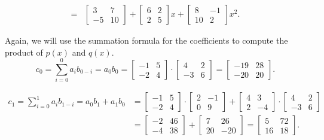 \begin{align*}
=&\begin{bmatrix} 
3 & 7 \\
-5 & 10
\end{bmatrix}
+\begin{bmatrix} 
6 & 2 \\
2 & 5
\end{bmatrix}x
+\begin{bmatrix}
8 & -1\\
10 & 2\end{bmatrix}x^2.
\end{align*}

Again, we will use the summation formula for the coefficients to compute the product of $p(x)$ and $q(x)$.
\[ c_0 = \sum_{i = 0}^0 a_i b_{0 - i} = a_0b_0= \begin{bmatrix} 
-1 & 5 \\
-2 & 4
\end{bmatrix} \cdot \begin{bmatrix} 
4 & 2 \\
-3 & 6
\end{bmatrix}= \begin{bmatrix} 
-19& 28\\
-20 & 20
\end{bmatrix}. \]

\begin{align*}
 c_1 = \sum_{i = 0}^1 a_i b_{1 - i} = a_0b_1+a_1b_0&=\begin{bmatrix} 
-1 & 5 \\
-2 & 4
\end{bmatrix} \cdot \begin{bmatrix} 
2 & -1\\
0 & 9
\end{bmatrix}+ \begin{bmatrix} 
4 & 3\\
2 & -4
\end{bmatrix} \cdot\begin{bmatrix}
4 & 2\\
-3 & 6
\end{bmatrix}\\
&=\begin{bmatrix}
-2 & 46\\
-4 & 38
\end{bmatrix}+\begin{bmatrix}
7 & 26\\
20 & -20
\end{bmatrix}=\begin{bmatrix}
5 & 72\\
16 & 18
\end{bmatrix}.
\end{align*}

